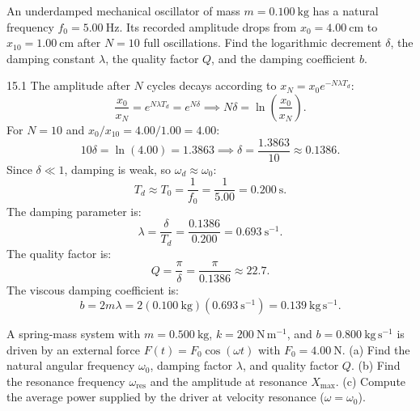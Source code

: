 \begin{worked}
An underdamped mechanical oscillator of mass $m=0.100\ \mathrm{kg}$ has a natural frequency $f_0 = 5.00\ \mathrm{Hz}$. Its recorded amplitude drops from $x_0 = 4.00\ \mathrm{cm}$ to $x_{10} = 1.00\ \mathrm{cm}$ after $N = 10$ full oscillations.
Find the logarithmic decrement $\delta$, the damping constant $\lambda$, the quality factor $Q$, and the damping coefficient $b$.
\end{worked}

\begin{solution}{15.1}
The amplitude after $N$ cycles decays according to $x_N = x_0 e^{-N\lambda T_d}$:
\[
\frac{x_0}{x_N} = e^{N\lambda T_d} = e^{N\delta} \implies N\delta = \ln\left(\frac{x_0}{x_N}\right).
\]
For $N = 10$ and $x_0/x_{10} = 4.00/1.00 = 4.00$:
\[
10\delta = \ln(4.00) = 1.3863 \implies \boxed{\delta = \frac{1.3863}{10} \approx \mathbf{0.1386.}}
\]
Since $\delta \ll 1$, damping is weak, so $\omega_d \approx \omega_0$:
\[
T_d \approx T_0 = \frac{1}{f_0} = \frac{1}{5.00} = 0.200\ \mathrm{s}.
\]
The damping parameter is:
\[
\lambda = \frac{\delta}{T_d} = \frac{0.1386}{0.200} = \mathbf{0.693\ \mathrm{s^{-1}}.}
\]
The quality factor is:
\[
Q = \frac{\pi}{\delta} = \frac{\pi}{0.1386} \approx \mathbf{22.7.}
\]
The viscous damping coefficient is:
\[
b = 2m\lambda = 2(0.100\ \mathrm{kg})(0.693\ \mathrm{s^{-1}}) = \mathbf{0.139\ \mathrm{kg\,s^{-1}}.}
\]
\end{solution}

\begin{worked}
A spring-mass system with $m = 0.500\ \mathrm{kg}$, $k = 200\ \mathrm{N\,m^{-1}}$, and $b = 0.800\ \mathrm{kg\,s^{-1}}$ is driven by an external force $F(t) = F_0\cos(\omega t)$ with $F_0 = 4.00\ \mathrm{N}$.
(a) Find the natural angular frequency $\omega_0$, damping factor $\lambda$, and quality factor $Q$.
(b) Find the resonance frequency $\omega_{\text{res}}$ and the amplitude at resonance $X_{\max}$.
(c) Compute the average power supplied by the driver at velocity resonance ($\omega = \omega_0$).
\end{worked}

